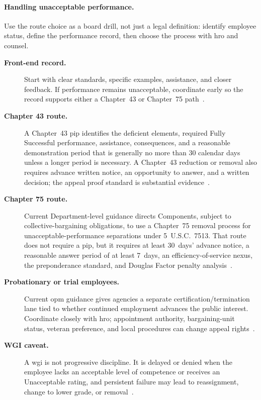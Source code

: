 \documentclass[../main.tex]{subfiles}
\begin{document}
\paragraph{Handling unacceptable performance.} Use the route choice as a board drill, not just a legal
definition: identify employee status, define the performance record, then choose the process with \ac{hro}
and counsel.
\begin{description}
  \item[\textbf{Front-end record.}] Start with clear standards, specific examples, assistance, and closer
  feedback. If performance remains unacceptable, coordinate early so the record supports either a
  Chapter~43 or Chapter~75 path~\autocite{edo-6-1-4-employee-relations-2025,opm-performance-management-federal-employees-2026}.
  \item[\textbf{Chapter 43 route.}] A Chapter~43 \ac{pip} identifies the deficient elements, required Fully
  Successful performance, assistance, consequences, and a reasonable demonstration period that is
  generally no more than 30 calendar days unless a longer period is necessary. A Chapter~43 reduction or
  removal also requires advance written notice, an opportunity to answer, and a written decision; the appeal
  proof standard is substantial evidence~\autocite{dodi-1400-25-v431-2025,USC-5-4303,USC-5-7701,ecfr-5cfr-432-105}.
  \item[\textbf{Chapter 75 route.}] Current Department-level guidance directs Components, subject to
  collective-bargaining obligations, to use a Chapter~75 removal process for unacceptable-performance
  separations under 5~U.S.C.~7513. That route does not require a \ac{pip}, but it requires at least
  30~days' advance notice, a reasonable answer period of at least 7~days, an efficiency-of-service nexus,
  the preponderance standard, and Douglas Factor penalty analysis~\autocite{uswpr-unacceptable-performance-separation-2025,USC-5-7513,USC-5-7701,ecfr-5cfr-752-404,opm-employee-rights-appeals,mspb-performance-actions,mspb-douglas-factors}.
  \item[\textbf{Probationary or trial employees.}] Current \ac{opm} guidance gives agencies a separate
  certification/termination lane tied to whether continued employment advances the public interest.
  Coordinate closely with \ac{hro}; appointment authority, bargaining-unit status, veteran preference, and
  local procedures can change appeal rights~\autocite{opm-probationary-periods-2025,opm-employee-rights-appeals}.
  \item[\textbf{WGI caveat.}] A \ac{wgi} is not progressive discipline. It is delayed or denied when the
  employee lacks an acceptable level of competence or receives an Unacceptable rating, and persistent
  failure may lead to reassignment, change to lower grade, or removal~\autocite{opm-performance-management-federal-employees-2026,opm-wgi-factsheet-2024}.
\end{description}
\end{document}

